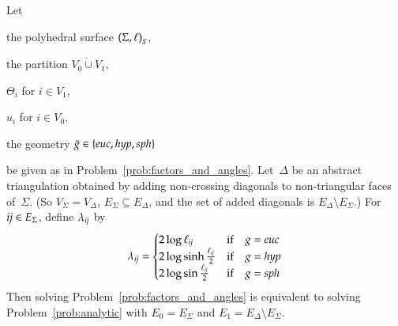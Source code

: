 \documentclass[Thesis]{subfiles}
\begin{document}
\begin{lemma}
  \label{lem:analytic}
  Let 
  \begin{compactitem}
  \item the polyhedral surface\/ $(\Sigma,\ell)_{g}$,
  \item the partition $V_{0}\dot\cup V_{1}$,
  \item $\Theta_{i}$ for $i\in V_{1}$,
  \item $u_{i}$ for $i\in V_{0}$,
  \item the geometry $\gt\in\{\euc,\hyp,\sph\}$
  \end{compactitem}
  be given as in Problem~\ref{prob:factors_and_angles}. Let~$\Delta$
  be an abstract triangulation obtained by adding non-crossing
  diagonals to non-triangular faces of\/~$\Sigma$. (So
  $V_{\Sigma}=V_{\Delta}$, $E_{\Sigma}\subseteq E_{\Delta}$, and the
  set of added diagonals is $E_{\Delta}\setminus E_{\Sigma}$.) For
  ${\it ij}\in E_{\Sigma}$, define $\lambda_{\it ij}$ by
  \begin{equation}
    \label{eq:lambda}
    \lambda_{\it ij}=
    \begin{cases}
      2\log\ell_{\it ij} & \text{if}\quad \g=\euc\\
      2\log\sinh\frac{\ell_{\it ij}}{2} & \text{if}\quad \g=\hyp\\
      2\log\sin\frac{\ell_{\it ij}}{2} & \text{if}\quad \g=\sph
    \end{cases}
  \end{equation}
  Then solving Problem~\ref{prob:factors_and_angles} is equivalent to
  solving Problem~\ref{prob:analytic} with $E_{0}=E_{\Sigma}$ and
  $E_{1}=E_{\Delta}\setminus E_{\Sigma}$.
\end{lemma}
\end{document}

